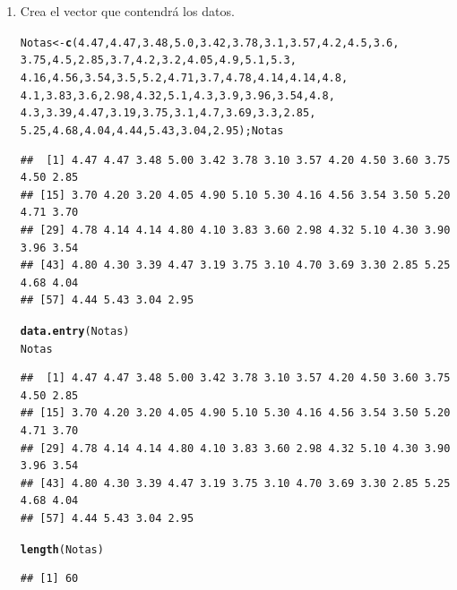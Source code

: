 \documentclass[12pt,letterpaper]{article}\usepackage[]{graphicx}\usepackage[]{color}
\makeatletter
\newcommand{\hlnum}[1]{\textcolor[rgb]{0.686,0.059,0.569}{#1}}%
\newcommand{\hlstd}[1]{\textcolor[rgb]{0.345,0.345,0.345}{#1}}%
\newcommand{\hlkwb}[1]{\textcolor[rgb]{0.69,0.353,0.396}{#1}}%
\newcommand{\hlkwd}[1]{\textcolor[rgb]{0.737,0.353,0.396}{\textbf{#1}}}%
\newenvironment{kframe}{%
 \def\at@end@of@kframe{}%
 \ifinner\ifhmode%
  \def\at@end@of@kframe{\end{minipage}}%
  \begin{minipage}{\columnwidth}%
 \fi\fi%
 \def\FrameCommand##1{\hskip\@totalleftmargin \hskip-\fboxsep
 \colorbox{shadecolor}{##1}\hskip-\fboxsep
     \hskip-\linewidth \hskip-\@totalleftmargin \hskip\columnwidth}%
 \MakeFramed {\advance\hsize-\width
   \@totalleftmargin\z@ \linewidth\hsize
   \@setminipage}}%
 {\par\unskip\endMakeFramed%
 \at@end@of@kframe}
\newenvironment{knitrout}{}{} %
\makeatother
\begin{document}
\begin{enumerate}
\item  Crea el vector que contendr\'a los datos.
\begin{knitrout}
\color{fgcolor}\begin{kframe}
\begin{alltt}
\hlstd{Notas} \hlkwb{<-} \hlkwd{c}\hlstd{(}\hlnum{4.47}\hlstd{,} \hlnum{4.47}\hlstd{,} \hlnum{3.48}\hlstd{,} \hlnum{5.0}\hlstd{,} \hlnum{3.42}\hlstd{,} \hlnum{3.78}\hlstd{,} \hlnum{3.1}\hlstd{,} \hlnum{3.57}\hlstd{,} \hlnum{4.2}\hlstd{,} \hlnum{4.5}\hlstd{,} \hlnum{3.6}\hlstd{,}
           \hlnum{3.75}\hlstd{,}  \hlnum{4.5}\hlstd{,}  \hlnum{2.85}\hlstd{,}  \hlnum{3.7}\hlstd{,}  \hlnum{4.2}\hlstd{,}  \hlnum{3.2}\hlstd{,}  \hlnum{4.05}\hlstd{,}  \hlnum{4.9}\hlstd{,}  \hlnum{5.1}\hlstd{,} \hlnum{5.3}\hlstd{,}
           \hlnum{4.16}\hlstd{,} \hlnum{4.56}\hlstd{,} \hlnum{3.54}\hlstd{,} \hlnum{3.5}\hlstd{,} \hlnum{5.2}\hlstd{,} \hlnum{4.71}\hlstd{,} \hlnum{3.7}\hlstd{,} \hlnum{4.78}\hlstd{,} \hlnum{4.14}\hlstd{,} \hlnum{4.14}\hlstd{,} \hlnum{4.8}\hlstd{,}
           \hlnum{4.1}\hlstd{,} \hlnum{3.83}\hlstd{,} \hlnum{3.6}\hlstd{,} \hlnum{2.98}\hlstd{,} \hlnum{4.32}\hlstd{,} \hlnum{5.1}\hlstd{,} \hlnum{4.3}\hlstd{,} \hlnum{3.9}\hlstd{,} \hlnum{3.96}\hlstd{,} \hlnum{3.54}\hlstd{,} \hlnum{4.8}\hlstd{,}
           \hlnum{4.3}\hlstd{,}  \hlnum{3.39}\hlstd{,} \hlnum{4.47}\hlstd{,} \hlnum{3.19}\hlstd{,} \hlnum{3.75}\hlstd{,} \hlnum{3.1}\hlstd{,}  \hlnum{4.7}\hlstd{,} \hlnum{3.69}\hlstd{,} \hlnum{3.3}\hlstd{,}  \hlnum{2.85}\hlstd{,}
           \hlnum{5.25}\hlstd{,} \hlnum{4.68}\hlstd{,} \hlnum{4.04}\hlstd{,} \hlnum{4.44}\hlstd{,} \hlnum{5.43}\hlstd{,} \hlnum{3.04}\hlstd{,} \hlnum{2.95}\hlstd{); Notas}
\end{alltt}
\begin{verbatim}
##  [1] 4.47 4.47 3.48 5.00 3.42 3.78 3.10 3.57 4.20 4.50 3.60 3.75 4.50 2.85
## [15] 3.70 4.20 3.20 4.05 4.90 5.10 5.30 4.16 4.56 3.54 3.50 5.20 4.71 3.70
## [29] 4.78 4.14 4.14 4.80 4.10 3.83 3.60 2.98 4.32 5.10 4.30 3.90 3.96 3.54
## [43] 4.80 4.30 3.39 4.47 3.19 3.75 3.10 4.70 3.69 3.30 2.85 5.25 4.68 4.04
## [57] 4.44 5.43 3.04 2.95
\end{verbatim}
\begin{alltt}
\hlkwd{data.entry}\hlstd{(Notas)}
\hlstd{Notas}
\end{alltt}
\begin{verbatim}
##  [1] 4.47 4.47 3.48 5.00 3.42 3.78 3.10 3.57 4.20 4.50 3.60 3.75 4.50 2.85
## [15] 3.70 4.20 3.20 4.05 4.90 5.10 5.30 4.16 4.56 3.54 3.50 5.20 4.71 3.70
## [29] 4.78 4.14 4.14 4.80 4.10 3.83 3.60 2.98 4.32 5.10 4.30 3.90 3.96 3.54
## [43] 4.80 4.30 3.39 4.47 3.19 3.75 3.10 4.70 3.69 3.30 2.85 5.25 4.68 4.04
## [57] 4.44 5.43 3.04 2.95
\end{verbatim}
\begin{alltt}
\hlkwd{length}\hlstd{(Notas)}
\end{alltt}
\begin{verbatim}
## [1] 60
\end{verbatim}
\end{kframe}
\end{knitrout}


\end{enumerate}
\end{document}
